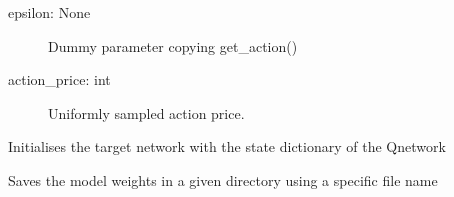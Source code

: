 \documentclass[letterpaper,10pt,english]{sphinxmanual}
\begin{document}
\begin{fulllineitems}
\begin{fulllineitems}
\begin{description}
\item[{epsilon: None}] \leavevmode
\sphinxAtStartPar
Dummy parameter copying get\_action()

\end{description}
\begin{description}
\item[{action\_price: int}] \leavevmode
\sphinxAtStartPar
Uniformly sampled action price.

\end{description}

\end{fulllineitems}


\begin{fulllineitems}
\label{\detokenize{MultiAgentMarketRL:agents.DQNAgent.reset_target_network}}
\sphinxAtStartPar
Initialises the target network with the state dictionary of the Q\sphinxhyphen{}network

\end{fulllineitems}


\begin{fulllineitems}
\label{\detokenize{MultiAgentMarketRL:agents.DQNAgent.save_model_weights}}
\sphinxAtStartPar
Saves the model weights in a given directory using a specific file name

\end{fulllineitems}


\end{fulllineitems}

\end{document}
